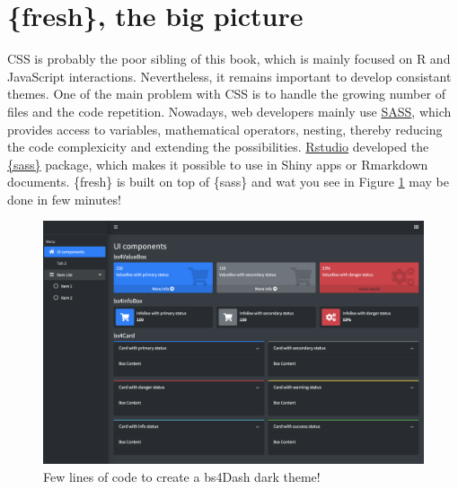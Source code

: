 \documentclass[
]{book}
\begin{document}
\hypertarget{fresh-the-big-picture}{%
\section{\{fresh\}, the big picture}\label{fresh-the-big-picture}}

CSS is probably the poor sibling of this book, which is mainly focused on R and JavaScript interactions. Nevertheless, it remains important to develop consistant themes. One of the main problem with CSS is to handle the growing number of files and the code repetition. Nowadays, web developers mainly use \href{https://sass-lang.com/guide}{SASS}, which provides access to variables, mathematical operators, nesting, thereby reducing the code complexicity and extending the possibilities. \href{https://rstudio.com}{Rstudio} developed the \href{https://rstudio.github.io/sass/articles/sass.html}{\{sass\}} package, which makes it possible to use in Shiny apps or Rmarkdown documents. \{fresh\} is built on top of \{sass\} and wat you see in Figure \ref{fig:bs4Dash-fresh} may be done in few minutes!

\begin{figure}
\includegraphics[width=34.22in]{images/beautify/bs4Dash-fresh} \caption{Few lines of code to create a bs4Dash dark theme!}\label{fig:bs4Dash-fresh}
\end{figure}
\end{document}
